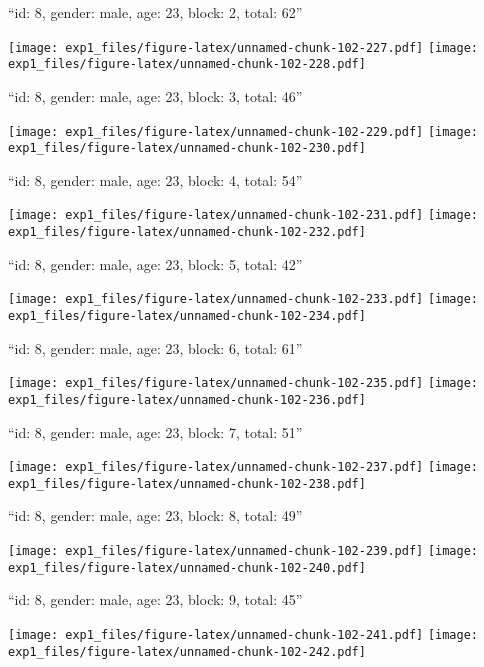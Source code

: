 \documentclass[11pt,,]{article}
\begin{document}
\newpage
[1] 

``id: 8, gender: male, age: 23, block: 2, total: 62''

\texttt{[image: exp1\_files/figure-latex/unnamed-chunk-102-227.pdf]}
\texttt{[image: exp1\_files/figure-latex/unnamed-chunk-102-228.pdf]}

\newpage
[1] 

``id: 8, gender: male, age: 23, block: 3, total: 46''

\texttt{[image: exp1\_files/figure-latex/unnamed-chunk-102-229.pdf]}
\texttt{[image: exp1\_files/figure-latex/unnamed-chunk-102-230.pdf]}

\newpage
[1] 

``id: 8, gender: male, age: 23, block: 4, total: 54''

\texttt{[image: exp1\_files/figure-latex/unnamed-chunk-102-231.pdf]}
\texttt{[image: exp1\_files/figure-latex/unnamed-chunk-102-232.pdf]}

\newpage
[1] 

``id: 8, gender: male, age: 23, block: 5, total: 42''

\texttt{[image: exp1\_files/figure-latex/unnamed-chunk-102-233.pdf]}
\texttt{[image: exp1\_files/figure-latex/unnamed-chunk-102-234.pdf]}

\newpage
[1] 

``id: 8, gender: male, age: 23, block: 6, total: 61''

\texttt{[image: exp1\_files/figure-latex/unnamed-chunk-102-235.pdf]}
\texttt{[image: exp1\_files/figure-latex/unnamed-chunk-102-236.pdf]}

\newpage
[1] 

``id: 8, gender: male, age: 23, block: 7, total: 51''

\texttt{[image: exp1\_files/figure-latex/unnamed-chunk-102-237.pdf]}
\texttt{[image: exp1\_files/figure-latex/unnamed-chunk-102-238.pdf]}

\newpage
[1] 

``id: 8, gender: male, age: 23, block: 8, total: 49''

\texttt{[image: exp1\_files/figure-latex/unnamed-chunk-102-239.pdf]}
\texttt{[image: exp1\_files/figure-latex/unnamed-chunk-102-240.pdf]}

\newpage
[1] 

``id: 8, gender: male, age: 23, block: 9, total: 45''

\texttt{[image: exp1\_files/figure-latex/unnamed-chunk-102-241.pdf]}
\texttt{[image: exp1\_files/figure-latex/unnamed-chunk-102-242.pdf]}
\end{document}
